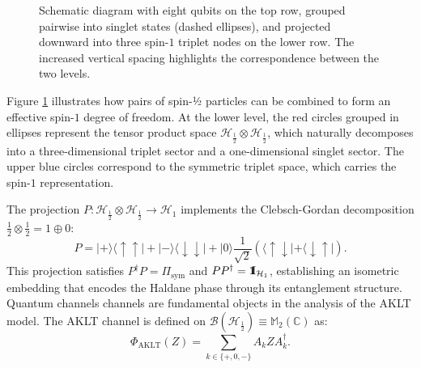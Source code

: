 \documentclass[12pt,a4paper]{article}
\def\id{{\bf 1}\!\!{\rm I}}
\begin{document}
\begin{figure}[h!]
\caption{Schematic diagram with eight qubits on the top row, grouped pairwise into singlet states (dashed ellipses), and projected downward into three spin-$1$ triplet nodes on the lower row. The increased vertical spacing highlights the correspondence between the two levels.}
\label{fig1}

\end{figure}


Figure \ref{fig1} illustrates how pairs of spin-½ particles can be combined to form an effective spin-$1$ degree of freedom. At the lower level, the red circles grouped in ellipses represent the tensor product space $\mathcal{H}_{\frac{1}{2}} \otimes \mathcal{H}_{\frac{1}{2}}$, which naturally decomposes into a three-dimensional triplet sector and a one-dimensional singlet sector. The upper blue circles correspond to the symmetric triplet space, which carries the spin-$1$ representation.

The  projection  $P: \mathcal{H}_{\frac{1}{2}} \otimes \mathcal{H}_{ \frac{1}{2}} \to \mathcal{H}_{1}$  implements the Clebsch-Gordan decomposition $\frac{1}{2} \otimes \frac{1}{2} = 1 \oplus 0$:
\begin{equation}
P = |+\rangle \langle \uparrow \uparrow| + |-\rangle \langle \downarrow \downarrow| + |0\rangle \frac{1}{\sqrt{2}}\left( \langle \uparrow \downarrow| + \langle \downarrow \uparrow| \right).
\end{equation}
This projection satisfies $P^\dagger P = \Pi_{\text{sym}}$ and $PP^\dagger = \id_{\mathcal{H}_{1}}$, establishing an isometric embedding that encodes the Haldane phase through its entanglement structure. Quantum channels channels are fundamental objects in the  analysis of the AKLT model. The AKLT channel is   defined  on $\mathcal{B}(\mathcal{H}_{\frac{1}{2}}) \equiv \mathbb{M}_2(\mathbb{C})$ as:
\begin{equation}\label{eq:aklE_channel}
    \Phi_{\mathrm{AKLT}}(Z) = \sum_{k \in \{+,0,-\}} A_k Z A_k^\dagger.
\end{equation}
\end{document}
